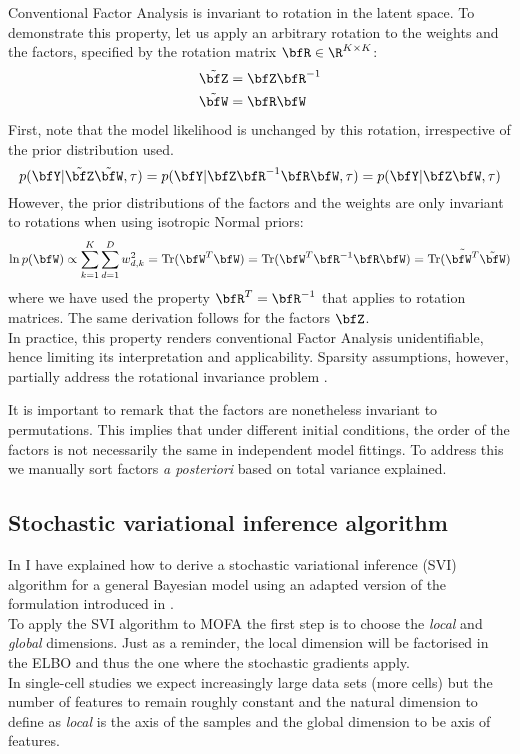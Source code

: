 Conventional Factor Analysis is invariant to rotation in the latent space\cite{Zhao2009}. To demonstrate this property, let us apply an arbitrary rotation to the weights and the factors, specified by the rotation matrix $\bfR \in \R^{K \times K}$:
\begin{align*}
	\tilde{\bfZ} &= \bfZ \bfR^{-1} \\
	\tilde{\bfW} &= \bfR \bfW
\end{align*}
First, note that the model likelihood is unchanged by this rotation, irrespective of the prior distribution used.
\begin{equation*}
		p(\bfY | \tilde{\bfZ} \tilde{\bfW}, \tau) = p(\bfY | \bfZ \bfR^{-1} \bfR \bfW, \tau) = p(\bfY | \bfZ \bfW, \tau)
\end{equation*}
However, the prior distributions of the factors and the weights are only invariant to rotations when using isotropic Normal priors:
\begin{equation*}
	\ln p(\bfW) \propto \sum_{k=1}^{K} \sum_{d=1}^{D} w_{d,k}^2 = \mathrm{Tr}(\bfW^T \bfW) = \mathrm{Tr}(\bfW^T \bfR^{-1} \bfR \bfW) = \mathrm{Tr}(\tilde{\bfW^T} \tilde{\bfW})
\end{equation*}
where we have used the property $\bfR^{T} = \bfR^{-1}$ that applies to rotation matrices. The same derivation follows for the factors $\bfZ$.\\
In practice, this property renders conventional Factor Analysis unidentifiable, hence limiting its interpretation and applicability. Sparsity assumptions, however, partially address the rotational invariance problem \cite{Hore2015}.

It is important to remark that the factors are nonetheless invariant to permutations. This implies that under different initial conditions, the order of the factors is not necessarily the same in independent model fittings. To address this we manually sort factors \textit{a posteriori} based on total variance explained.


\subsection{Stochastic variational inference algorithm}

In  I have explained how to derive a stochastic variational inference (SVI) algorithm for a general Bayesian model using an adapted version of the formulation introduced in \cite{Hoffman2012}.\\
To apply the SVI algorithm to MOFA the first step is to choose the \textit{local} and \textit{global} dimensions. Just as a reminder, the local dimension will be factorised in the ELBO and thus the one where the stochastic gradients apply.\\
In single-cell studies we expect increasingly large data sets (more cells) but the number of features to remain roughly constant and the natural dimension to define as \textit{local} is the axis of the samples and the global dimension to be axis of features.

